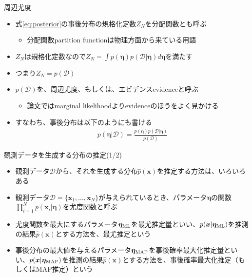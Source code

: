 \documentclass[aspectratio=169,unicode,dvipdfmx,14pt]{beamer}
\begin{document}
\begin{frame}{周辺尤度}
\begin{itemize}
\item 式\eqref{eq:posterior}の事後分布の規格化定数$Z_N$を分配関数とも呼ぶ
\begin{itemize}
\item 分配関数partition functionは物理方面から来ている用語
\end{itemize}
\item $Z_N$は規格化定数なので$Z_N = \int p(\bm{\eta}) p(\mathcal{D}|\bm{\eta}) d\bm{\eta}$を満たす
\item つまり$Z_N = p(\mathcal{D})$
\item $p(\mathcal{D})$を、周辺尤度、もしくは、エビデンスevidenceと呼ぶ
\begin{itemize}
\item 論文ではmarginal likelihoodよりevidenceのほうをよく見かける
\end{itemize}
\item すなわち、事後分布は以下のようにも書ける
\begin{align}
p(\bm{\eta} | \mathcal{D}) = \frac{ p(\bm{\eta}) p(\mathcal{D}|\bm{\eta}) }{ p(\mathcal{D}) }
\end{align}
\end{itemize}
\end{frame}

\begin{frame}{観測データを生成する分布の推定(1/2)}
\begin{itemize}
\item 観測データ$\mathcal{D}$から、それを生成する分布$\hat{p}(\bm{x})$を推定する方法は、いろいろある
\item 観測データ$\mathcal{D}=\{\bm{x}_1,\ldots,\bm{x}_N\}$が与えられているとき、パラメータ$\bm{\eta}$の関数$\prod_{i=1}^N p(\bm{x}_i|\bm{\eta})$を尤度関数と呼ぶ
\item[1.] 尤度関数を最大にするパラメータ$\bm{\eta}_{\mbox{\scriptsize ML}}$を最尤推定量といい、$p(\bm{x} | \bm{\eta}_{\mbox{\scriptsize ML}})$を推測の結果$\hat{p}(\bm{x})$とする方法を、最尤推定という
\item[2.] 事後分布の最大値を与えるパラメータ$\bm{\eta}_{\mbox{\scriptsize MAP}}$を事後確率最大化推定量といい、$p(\bm{x} | \bm{\eta}_{\mbox{\scriptsize MAP}})$を推測の結果$\hat{p}(\bm{x})$とする方法を、事後確率最大化推定（もしくはMAP推定）という
\end{itemize}
\end{frame}
\end{document}
